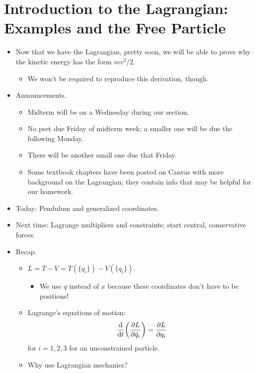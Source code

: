 \documentclass[../notes.tex]{subfiles}
\begin{document}
\section{Introduction to the Lagrangian: Examples and the Free Particle}
\begin{itemize}
    \item {}Now that we have the Lagrangian, pretty soon, we will be able to prove why the kinetic energy has the form $mv^2/2$.
    \begin{itemize}
        \item We won't be required to reproduce this derivation, though.
    \end{itemize}
    \item Announcements.
    \begin{itemize}
        \item Midterm will be on a Wednesday during our section.
        \item No pset due Friday of midterm week; a smaller one will be due the following Monday.
        \item There will be another small one due that Friday.
        \item Some textbook chapters have been posted on Canvas with more background on the Lagrangian; they contain info that may be helpful for our homework.
    \end{itemize}
    \item Today: Pendulum and generalized coordinates.
    \item Next time: Lagrange multipliers and constraints; start central, conservative forces.
    \item Recap.
    \begin{itemize}
        \item $L=T-V=T(\{q_i\})-V(\{q_i\})$.
        \begin{itemize}
            \item We use $q$ instead of $x$ because these coordinates don't have to be positions!
        \end{itemize}
        \item Lagrange's equations of motion:
        \begin{equation*}
            \dv{t}(\pdv{L}{\dot{q}_i}) = \pdv{L}{q_i}
        \end{equation*}
        for $i=1,2,3$ for an unconstrained particle.
        \item Why use Lagrangian mechanics?
        \begin{enumerate}

\end{enumerate}
\end{itemize}
\end{itemize}
\end{document}
